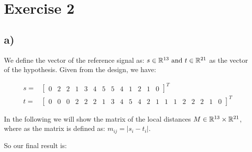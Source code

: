 \section*{Exercise 2} %
\label{sec:section_name}

\subsection*{a)}
\label{sub:subsection_name}

We define the vector of the reference signal as: $s \in \mathbb{R}^{13} \text{ and } t \in \mathbb{R}^{21}$ as the vector of the hypothesis.
Given from the design, we have: 

\begin{align} 
s =& \left[\begin{array}{ccccccccccccc} 0 & 2 & 2 & 1 & 3 & 4 & 5 & 5 & 4 & 1 & 2 & 1 & 0 \end{array}\right]^{T} \\
t =& \left[\begin{array}{ccccccccccccccccccccc} 0 & 0 & 0 & 2 & 2 & 2 & 1 & 3 & 4 & 5 & 4 & 2 & 1 & 1 & 1 & 2 & 2 & 2 & 1 & 0 \end{array}\right]^{T}	
\end{align}

In the following we will show the matrix of the local distances $M \in \mathbb{R}^{13} \times \mathbb{R}^{21}$, where as the matrix 
is defined as: $m_{ij} = |s_{i} - t_{i}| $.

So our final result is: 

